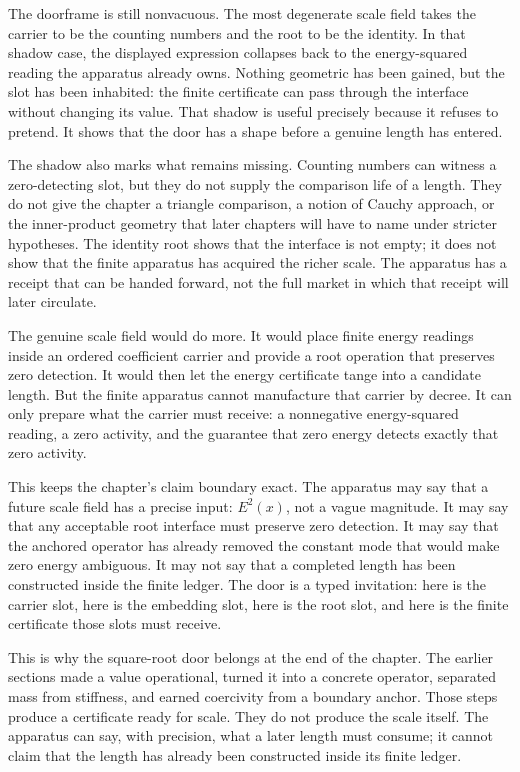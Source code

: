 The doorframe is still nonvacuous. The most degenerate scale field takes the
carrier to be the counting numbers and the root to be the identity. In that
shadow case, the displayed expression collapses back to the energy-squared
reading the apparatus already owns. Nothing geometric has been gained, but the
slot has been inhabited: the finite certificate can pass through the interface
without changing its value. That shadow is useful precisely because it refuses
to pretend. It shows that the door has a shape before a genuine length has
entered.

The shadow also marks what remains missing. Counting numbers can witness a
zero-detecting slot, but they do not supply the comparison life of a length.
They do not give the chapter a triangle comparison, a notion of Cauchy approach,
or the inner-product geometry that later chapters will have to name under
stricter hypotheses. The identity root shows that the interface is not empty;
it does not show that the finite apparatus has acquired the richer scale. The
apparatus has a receipt that can be handed forward, not the full market in which
that receipt will later circulate.

The genuine scale field would do more. It would place finite energy readings
inside an ordered coefficient carrier and provide a root operation that preserves
zero detection. It would then let the energy certificate tange into a candidate
length. But the finite apparatus cannot manufacture that carrier by decree. It
can only prepare what the carrier must receive: a nonnegative energy-squared
reading, a zero activity, and the guarantee that zero energy detects exactly that
zero activity.

This keeps the chapter's claim boundary exact. The apparatus may say that a
future scale field has a precise input: \(E^2(x)\), not a vague magnitude. It
may say that any acceptable root interface must preserve zero detection. It may
say that the anchored operator has already removed the constant mode that would
make zero energy ambiguous. It may not say that a completed length has been
constructed inside the finite ledger. The door is a typed invitation: here is
the carrier slot, here is the embedding slot, here is the root slot, and here is
the finite certificate those slots must receive.

This is why the square-root door belongs at the end of the chapter. The earlier
sections made a value operational, turned it into a concrete operator, separated
mass from stiffness, and earned coercivity from a boundary anchor. Those steps
produce a certificate ready for scale. They do not produce the scale itself. The
apparatus can say, with precision, what a later length must consume; it cannot
claim that the length has already been constructed inside its finite ledger.


